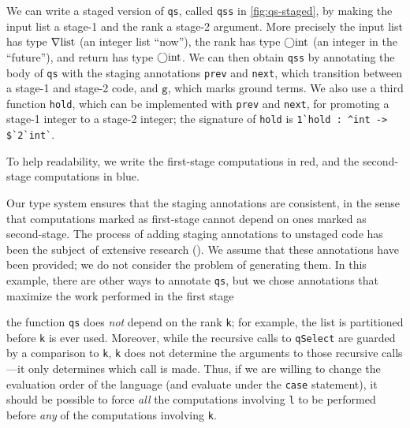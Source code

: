 \begin{abstrsyn}
We can write a staged version of \texttt{qs}, called
\texttt{qss} in \ref{fig:qs-staged}, by making the input list a
stage-1 and the rank a stage-2 argument. 
%
More precisely the input list
has type $\nabla\mathrm{list}$ (an integer list ``now''), the rank has
type $\bigcirc{\rm int}$ (an integer in the ``future''), and return has type
$\bigcirc{\rm int}$.  
%
We can then obtain \texttt{qss} by annotating the body of \texttt{qs}
with the staging annotations \texttt{prev} and \texttt{next}, which
transition between a stage-1 and stage-2 code, and $\texttt{g}$, which
marks ground terms.  
%
We also use a third function
\texttt{hold}, which can be implemented with \texttt{prev} and
\texttt{next}, for promoting a stage-1 integer to a stage-2 integer;
the signature of \texttt{hold} is
% 
\lstinline{1`hold : ^int -> $`2`int`}.

To help readability, we write the first-stage
computations in red, and the second-stage computations in blue.

Our type system ensures that the staging annotations are consistent,
in the sense that computations marked as first-stage cannot depend on
ones marked as second-stage.
%
The process of adding staging annotations to unstaged code has been
the subject of extensive research (). We assume that
these annotations have been provided; we do not consider the problem
of generating them. In this example, there are other ways to annotate
\texttt{qs}, but we chose annotations that maximize the work performed
in the first stage






the
function \texttt{qs} does \emph{not} depend on the rank \texttt{k};
for example, the list is partitioned before \texttt{k} is ever
used. Moreover, while the recursive calls to \texttt{qSelect} are
guarded by a comparison to \texttt{k}, \texttt{k} does not determine
the arguments to those recursive calls---it only determines which call
is made. Thus, if we are willing to change the evaluation order of the
language (and evaluate under the \texttt{case} statement), it should
be possible to force \emph{all} the computations involving \texttt{l}
to be performed before \emph{any} of the computations involving
\texttt{k}.




\end{abstrsyn}
